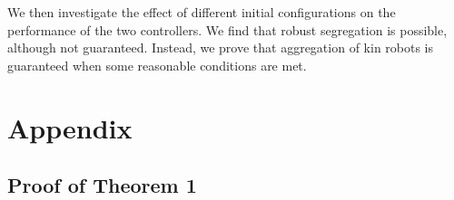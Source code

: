 \documentclass[conference]{IEEEtran}
\begin{document}
We then investigate the effect of different initial configurations on the performance of the two controllers. We find that robust segregation is possible, although not guaranteed. Instead, we prove that aggregation of kin robots is guaranteed when some reasonable conditions are met.




\onecolumn
\appendix
\section{Appendix}

  \subsection{Proof of Theorem 1} \label{thm:1}
\end{document}
